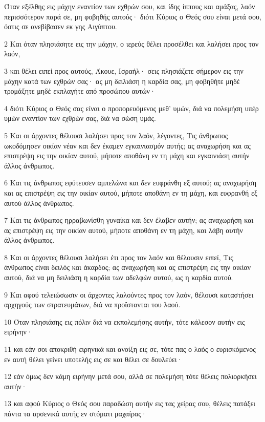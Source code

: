 \par Όταν εξέλθης εις μάχην εναντίον των εχθρών σου, και ίδης ίππους και αμάξας, λαόν περισσότερον παρά σε, μη φοβηθής αυτούς· διότι Κύριος ο Θεός σου είναι μετά σου, όστις σε ανεβίβασεν εκ γης Αιγύπτου.
\par 2 Και όταν πλησιάσητε εις την μάχην, ο ιερεύς θέλει προσέλθει και λαλήσει προς τον λαόν,
\par 3 και θέλει ειπεί προς αυτούς, Άκουε, Ισραήλ· σεις πλησιάζετε σήμερον εις την μάχην κατά των εχθρών σας· ας μη δειλιάση η καρδία σας, μη φοβηθήτε μηδέ τρομάξητε μηδέ εκπλαγήτε από προσώπου αυτών·
\par 4 διότι Κύριος ο Θεός σας είναι ο προπορευόμενος μεθ' υμών, διά να πολεμήση υπέρ υμών εναντίον των εχθρών σας, διά να σώση υμάς.
\par 5 Και οι άρχοντες θέλουσι λαλήσει προς τον λαόν, λέγοντες, Τις άνθρωπος ωκοδόμησεν οικίαν νέαν και δεν έκαμεν εγκαινιασμόν αυτής; ας αναχωρήση και ας επιστρέψη εις την οικίαν αυτού, μήποτε αποθάνη εν τη μάχη και εγκαινιάση αυτήν άλλος άνθρωπος.
\par 6 Και τις άνθρωπος εφύτευσεν αμπελώνα και δεν ευφράνθη εξ αυτού; ας αναχωρήση και ας επιστρέψη εις την οικίαν αυτού, μήποτε αποθάνη εν τη μάχη, και ευφρανθή εξ αυτού άλλος άνθρωπος.
\par 7 Και τις άνθρωπος ηρραβωνίσθη γυναίκα και δεν έλαβεν αυτήν; ας αναχωρήση και ας επιστρέψη εις την οικίαν αυτού, μήποτε αποθάνη εν τη μάχη, και λάβη αυτήν άλλος άνθρωπος.
\par 8 Και οι άρχοντες θέλουσι λαλήσει έτι προς τον λαόν και θέλουσιν ειπεί, Τις άνθρωπος είναι δειλός και άκαρδος; ας αναχωρήση και ας επιστρέψη εις την οικίαν αυτού, διά να μη δειλιάση η καρδία των αδελφών αυτού, ως η καρδία αυτού.
\par 9 Και αφού τελειώσωσιν οι άρχοντες λαλούντες προς τον λαόν, θέλουσι καταστήσει αρχηγούς των στρατευμάτων, διά να προΐστανται του λαού.
\par 10 Όταν πλησιάσης εις πόλιν διά να εκπολεμήσης αυτήν, τότε κάλεσον αυτήν εις ειρήνην·
\par 11 και εάν σοι αποκριθή ειρηνικά και ανοίξη εις σε, τότε πας ο λαός ο ευρισκόμενος εν αυτή θέλει γείνει υποτελής εις σε και θέλει σε δουλεύει·
\par 12 εάν όμως δεν κάμη ειρήνην μετά σου, αλλά σε πολεμήση τότε θέλεις πολιορκήσει αυτήν·
\par 13 και αφού Κύριος ο Θεός σου παραδώση αυτήν εις τας χείρας σου, θέλεις πατάξει πάντα τα αρσενικά αυτής εν στόματι μαχαίρας·
